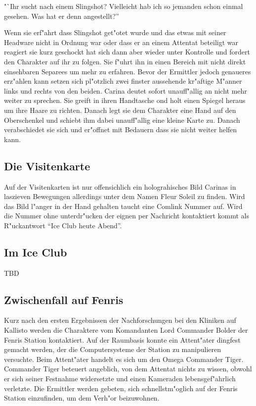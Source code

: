 "`Ihr sucht nach einem Slingshot? Vielleicht hab ich so jemanden schon einmal gesehen. Was hat er denn angestellt?''

Wenn sie erf"ahrt dass Slingshot get"otet wurde und das etwas mit seiner Headware nicht in Ordnung war oder dass er an einem Attentat beteiligt war reagiert sie kurz geschockt hat sich dann aber wieder unter Kontrolle und fordert den Charakter auf ihr zu folgen. Sie f"uhrt ihn in einen Bereich mit nicht direkt einsehbaren Separees um mehr zu erfahren. Bevor der Ermittler jedoch genaueres erz"ahlen kann setzen sich pl"otzlich zwei finster aussehende kr"aftige M"anner links und rechts von den beiden. Carina deutet sofort unauff"allig an nicht mehr weiter zu sprechen. Sie greift in ihren Handtasche ond holt einen Spiegel heraus um ihre Haare zu richten. Danach legt sie dem Charakter eine Hand auf den Oberschenkel und schiebt ihm dabei unauff"allig eine kleine Karte zu. Danach verabschiedet sie sich und er"offnet mit Bedauern dass sie nicht weiter helfen kann.

\subsection{Die Visitenkarte}

Auf der Visitenkarten ist nur offensichlich ein holograhisches Bild Carinas in laszieven Bewegungen allerdings unter dem Namen Fleur Soleil zu finden. Wird das Bild l"anger in der Hand gehalten taucht eine Comlink Nummer auf. Wird die Nummer ohne unterdr"ucken der eignen per Nachricht kontaktiert kommt als R"uckantwort "`Ice Club heute Abend"'.

\subsection{Im Ice Club}

TBD

\subsection{Zwischenfall auf Fenris}

Kurz nach den ersten Ergebnissen der Nachforschungen bei den Kliniken auf Kallisto werden die Charaktere vom Komandanten Lord Commander Bolder der Fenris Station kontaktiert. Auf der Raumbasis konnte ein Attent"ater dingfest gemacht werden, der die Computersysteme der Station zu manipulieren versuchte. Beim Attent"ater handelt es sich um den Omega Commander Tiger. Commander Tiger beteuert angeblich, von dem Attentat nichts zu wissen, obwohl er sich seiner Festnahme widersetzte und einen Kameraden lebensgef"ahrlich verletzte. Die Ermittler werden gebeten, sich schnellstm"oglich auf der Fenris Station einzufinden, um dem Verh"or beizuwohnen.

